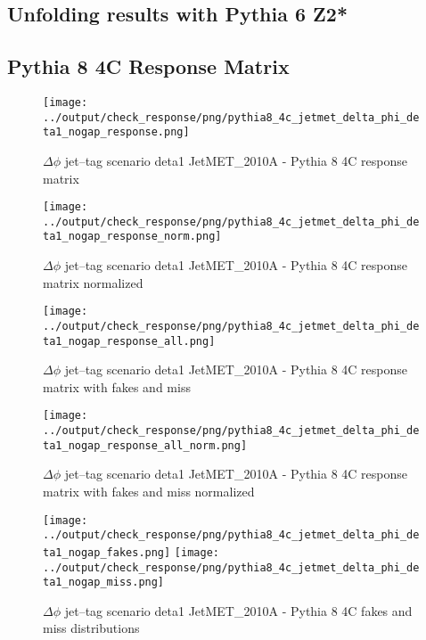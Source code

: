 \documentclass[11pt]{book}
\begin{document}
\clearpage
\subsection{Unfolding results with Pythia 6 Z2*}


\clearpage
\subsection{Pythia 8 4C Response Matrix}


\begin{figure}[ht]
\centering
\texttt{[image: ../output/check\_response/png/pythia8\_4c\_jetmet\_delta\_phi\_deta1\_nogap\_response.png]}
\caption{$\Delta\phi$ jet--tag scenario deta1 JetMET\_2010A - Pythia 8 4C response matrix}
\label{p8_jetmet_delta_phi_deta1_nogap_response}
\end{figure}

\begin{figure}[ht]
\centering
\texttt{[image: ../output/check\_response/png/pythia8\_4c\_jetmet\_delta\_phi\_deta1\_nogap\_response\_norm.png]}
\caption{$\Delta\phi$ jet--tag scenario deta1 JetMET\_2010A - Pythia 8 4C response matrix normalized}
\label{p8_jetmet_delta_phi_deta1_nogap_response_norm}
\end{figure}

\begin{figure}[ht]
\centering
\texttt{[image: ../output/check\_response/png/pythia8\_4c\_jetmet\_delta\_phi\_deta1\_nogap\_response\_all.png]}
\caption{$\Delta\phi$ jet--tag scenario deta1 JetMET\_2010A - Pythia 8 4C response matrix with fakes and miss}
\label{p8_jetmet_delta_phi_deta1_nogap_response_all}
\end{figure}

\begin{figure}[ht]
\centering
\texttt{[image: ../output/check\_response/png/pythia8\_4c\_jetmet\_delta\_phi\_deta1\_nogap\_response\_all\_norm.png]}
\caption{$\Delta\phi$ jet--tag scenario deta1 JetMET\_2010A - Pythia 8 4C response matrix with fakes and miss normalized}
\label{p8_jetmet_delta_phi_deta1_nogap_response_all_norm}
\end{figure}

\begin{figure}[ht]
\centering
\texttt{[image: ../output/check\_response/png/pythia8\_4c\_jetmet\_delta\_phi\_deta1\_nogap\_fakes.png]}
\texttt{[image: ../output/check\_response/png/pythia8\_4c\_jetmet\_delta\_phi\_deta1\_nogap\_miss.png]}
\caption{$\Delta\phi$ jet--tag scenario deta1 JetMET\_2010A - Pythia 8 4C fakes and miss distributions}
\label{p8_jetmet_delta_phi_deta1_nogap_fakesmiss}
\end{figure}
\end{document}

